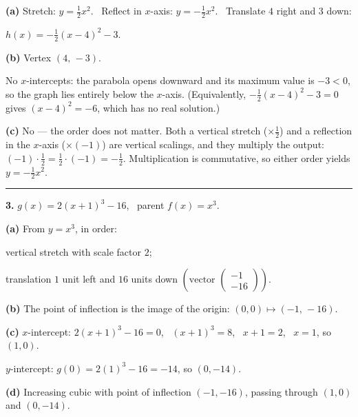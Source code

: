 \documentclass[12pt, twoside]{article}
\begin{document}
\medskip

\textbf{(a)} Stretch: $y=\tfrac{1}{2}x^2$. \ Reflect in $x$-axis:
$y=-\tfrac{1}{2}x^2$. \ Translate $4$ right and $3$ down:

$\displaystyle h(x)=-\tfrac{1}{2}(x-4)^2-3$.

\medskip

\textbf{(b)} Vertex $(4,\,-3)$.

No $x$-intercepts: the parabola opens downward and its maximum value is
$-3<0$, so the graph lies entirely below the $x$-axis. (Equivalently,
$-\tfrac{1}{2}(x-4)^2-3=0$ gives $(x-4)^2=-6$, which has no real solution.)

\medskip

\textbf{(c)} No --- the order does not matter. Both a vertical stretch
($\times\tfrac{1}{2}$) and a reflection in the $x$-axis ($\times(-1)$) are
vertical scalings, and they multiply the output: $(-1)\cdot\tfrac{1}{2}
=\tfrac{1}{2}\cdot(-1)=-\tfrac{1}{2}$. Multiplication is commutative, so either
order yields $y=-\tfrac{1}{2}x^2$.

\bigskip\hrule\bigskip

\noindent\textbf{3.} $\displaystyle g(x)=2(x+1)^3-16$, \ parent $f(x)=x^3$.

\medskip

\textbf{(a)} From $y=x^3$, in order:

\quad vertical stretch with scale factor $2$;

\quad translation $1$ unit left and $16$ units down
$\left(\text{vector } \left(\begin{smallmatrix}-1\\-16\end{smallmatrix}\right)\right)$.

\medskip

\textbf{(b)} The point of inflection is the image of the origin:
$(0,0)\mapsto(-1,\,-16)$.

\medskip

\textbf{(c)} $x$-intercept: $2(x+1)^3-16=0$, \ $(x+1)^3=8$, \ $x+1=2$, \ $x=1$,
so $(1,0)$.

$y$-intercept: $g(0)=2(1)^3-16=-14$, so $(0,-14)$.

\medskip

\textbf{(d)} Increasing cubic with point of inflection $(-1,-16)$, passing
through $(1,0)$ and $(0,-14)$.
\end{document}
